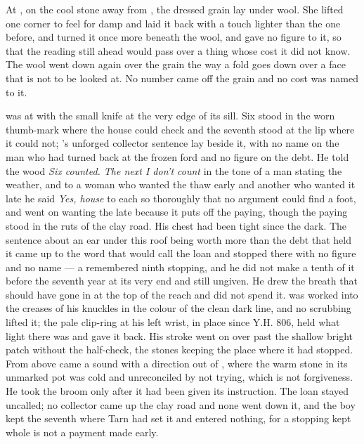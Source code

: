 At , on the cool stone away from , the dressed grain lay under wool. She lifted one corner to feel for damp and laid it back with a touch lighter than the one before, and turned it once more beneath the wool, and gave no figure to it, so that the reading still ahead would pass over a thing whose cost it did not know. The wool went down again over the grain the way a fold goes down over a face that is not to be looked at. No number came off the grain and no cost was named to it.

\scenebreak

 was at  with the small knife at the very edge of its sill. Six stood in the worn thumb-mark where the house could check and the seventh stood at the lip where it could not; 's unforged collector sentence lay beside it, with no name on the man who had turned back at the frozen ford and no figure on the debt. He told the wood \emph{Six counted. The next I don't count} in the tone of a man stating the weather, and to a woman who wanted the thaw early and another who wanted it late he said \emph{Yes, house} to each so thoroughly that no argument could find a foot, and went on wanting the late because it puts off the paying, though the paying stood in the ruts of the clay road. His chest had been tight since the dark. The sentence about an ear under this roof being worth more than the debt that held it came up to the word that would call the loan and stopped there with no figure and no name --- a remembered ninth stopping, and he did not make a tenth of it before the seventh year at its very end and still ungiven. He drew the breath that should have gone in at the top of the reach and did not spend it.  was worked into the creases of his knuckles in the colour of the clean dark line, and no scrubbing lifted it; the pale clip-ring at his left wrist, in place since Y.H. 806, held what light there was and gave it back. His stroke went on over  past the shallow bright patch without the half-check, the stones keeping the place where it had stopped. From above came a sound with a direction out of , where the warm stone in its unmarked pot was cold and unreconciled by not trying, which is not forgiveness. He took the broom only after it had been given its instruction. The loan stayed uncalled; no collector came up the clay road and none went down it, and the boy kept the seventh where Tarn had set it and entered nothing, for a stopping kept whole is not a payment made early.


